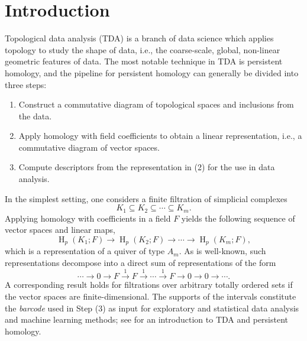\documentclass[a4paper]{amsart}
\theoremstyle{plain}
\theoremstyle{definition}
\theoremstyle{remark}
\begin{document}
\section{Introduction}
Topological data analysis (TDA) is a branch of data science which applies topology to study the shape of data, i.e., the coarse-scale, global, non-linear geometric features of data. The most notable technique in TDA is persistent homology, and the  pipeline for persistent homology can generally be divided into three steps:
\begin{enumerate}
\item Construct a commutative diagram of topological spaces and inclusions from the data. 
\item Apply homology with field coefficients to obtain a linear representation, i.e., a commutative diagram of vector spaces. 
\item Compute descriptors from the representation in (2) for the use in data analysis.
\end{enumerate}
In the simplest setting, one considers a finite filtration of simplicial complexes \[K_1 \subseteq K_2 \subseteq \cdots \subseteq K_m.\]
Applying homology with coefficients in a field $F$ yields the following sequence of vector spaces and linear maps, \[\operatorname{H}_p(K_1;F) \to \operatorname{H}_p(K_2;F)\to \cdots \to \operatorname{H}_p(K_m;F),\]
which is a representation of a quiver of type $A_m$.
As is well-known, such representations decompose into a direct sum of representations of the form 
\[ \cdots \to 0 \to F \xrightarrow{1} F \xrightarrow{1} \cdots \xrightarrow{1} F \to 0 \to 0\to \cdots.\]
A corresponding result holds for filtrations over arbitrary totally ordered sets if the vector spaces are finite-dimensional. The supports of the intervals constitute the \emph{barcode} used in Step (3) as input for exploratory and statistical data analysis and machine learning methods; see \cite{chazal2021introduction} for an introduction to TDA and persistent homology.
\end{document}
